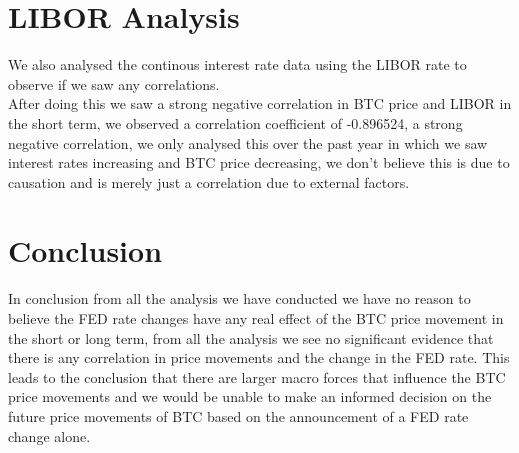 \documentclass[12pt]{article}
\begin{document}
\newpage
\section{LIBOR Analysis}
We also analysed the continous interest rate data using the LIBOR rate to observe if we saw any correlations.\\

After doing this we saw a strong negative correlation in BTC price and LIBOR in the short term, we observed a correlation coefficient of -0.896524, a strong negative correlation, we only analysed this over the past year in which we saw interest rates increasing and BTC price decreasing, we don't believe this is due to causation and is merely just a correlation due to external factors.
\section{Conclusion}
In conclusion from all the analysis we have conducted we have no reason to believe the FED rate changes have any real effect of the BTC price movement in the short or long term, from all the analysis we see no significant evidence that there is any correlation in price movements and the change in the FED rate. This leads to the conclusion that there are larger macro forces that influence the BTC price movements and we would be unable to make an informed decision on the future price movements of BTC based on the announcement of a FED rate change alone.
\end{document}
